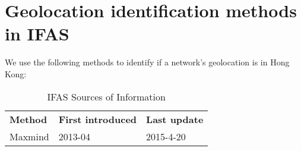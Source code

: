 \FloatBarrier

\section{Geolocation identification methods in IFAS}
We use the following methods to identify if a network's geolocation is in Hong Kong:
\begin{table}[!htbp]
\centering
\caption{IFAS Sources of Information}
\begin{tabular}{lll}
\hline
{\bf Method} & {\bf First introduced} & \bf Last update                                                                         \\\hhline{===}

Maxmind & 2013-04 & 2015-4-20
\\\hline
\end{tabular}
\end{table}
\newpage


